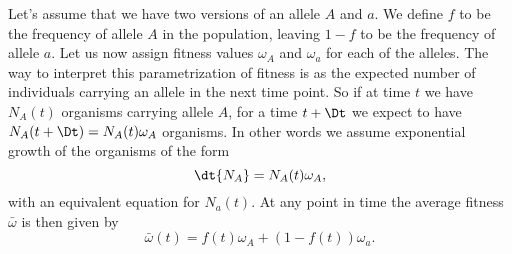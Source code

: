 Let's assume that we have two versions of an allele $A$ and $a$. We define $f$
to be the frequency of allele $A$ in the population, leaving $1 - f$ to be the
frequency of allele $a$. Let us now assign fitness values $\omega_A$ and
$\omega_a$ for each of the alleles. The way to interpret this parametrization of
fitness is as the expected number of individuals carrying an allele in the next
time point. So if at time $t$ we have $N_A(t)$ organisms carrying allele $A$,
for a time $t + \Dt$ we expect to have $N_A(t + \Dt) = N_A(t) \omega_A$
organisms. In other words we assume exponential growth of the organisms of the
form
\begin{equation}
  \dt{N_A} = N_A(t) \omega_A,
\end{equation}
with an equivalent equation for $N_a(t)$. At any point in time the average
fitness $\bar{\omega}$ is then given by
\begin{equation}
  \bar{\omega}(t) = f(t) \omega_A + (1 - f(t)) \omega_a.
\end{equation}

